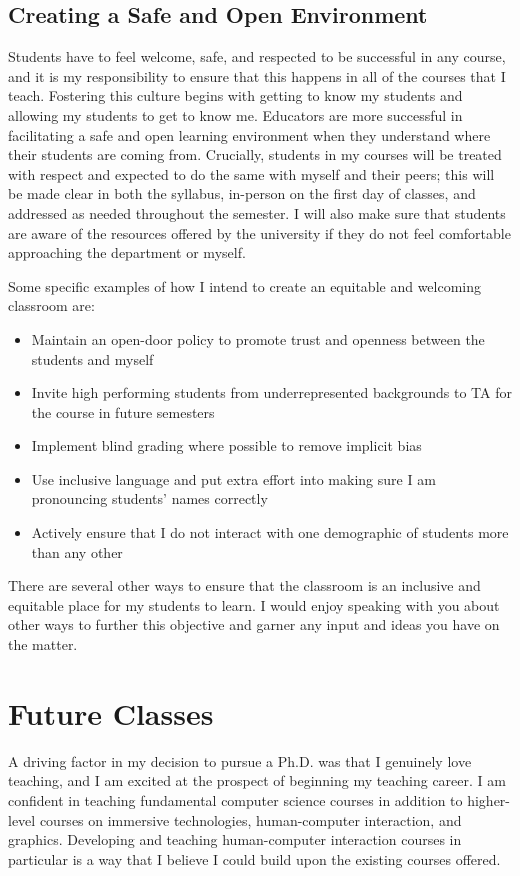 \subsection*{Creating a Safe and Open Environment}
\vspace{-0.5cm}
Students have to feel welcome, safe, and respected to be successful in any course, and it is my responsibility to ensure that this happens in all of the courses that I teach. Fostering this culture begins with getting to know my students and allowing my students to get to know me. Educators are more successful in facilitating a safe and open learning environment when they understand where their students are coming from. Crucially, students in my courses will be treated with respect and expected to do the same with myself and their peers; this will be made clear in both the syllabus, in-person on the first day of classes, and addressed as needed throughout the semester. I will also make sure that students are aware of the resources offered by the university if they do not feel comfortable approaching the department or myself.

Some specific examples of how I intend to create an equitable and welcoming classroom are: 
\begin{itemize}
    \item Maintain an open-door policy to promote trust and openness between the students and myself
    \item Invite high performing students from underrepresented backgrounds to TA for the course in future semesters
    \item Implement blind grading where possible to remove implicit bias
    \item Use inclusive language and put extra effort into making sure I am pronouncing students' names correctly
    \item Actively ensure that I do not interact with one demographic of students more than any other
\end{itemize}

There are several other ways to ensure that the classroom is an inclusive and equitable place for my students to learn. I would enjoy speaking with you about other ways to further this objective and garner any input and ideas you have on the matter.

\section*{Future Classes}
\vspace{-0.5cm}
A driving factor in my decision to pursue a Ph.D. was that I genuinely love teaching, and I am excited at the prospect of beginning my teaching career. I am confident in teaching fundamental computer science courses in addition to higher-level courses on immersive technologies, human-computer interaction, and graphics. Developing and teaching human-computer interaction courses in particular is a way that I believe I could build upon the existing courses offered.

